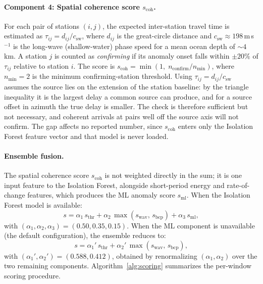 \documentclass{article}
\begin{document}
\paragraph{Component 4: Spatial coherence score $s_\text{coh}$.}
For each pair of stations $(i, j)$, the expected inter-station
travel time is estimated as $\tau_{ij} = d_{ij} / c_\text{sw}$,
where $d_{ij}$ is the great-circle distance and $c_\text{sw} \approx
198$\,m\,s$^{-1}$ is the long-wave (shallow-water) phase speed
for a mean ocean depth of ${\sim}4$\,km. A
station $j$ is counted as \emph{confirming} if its anomaly onset
falls within $\pm 20\%$ of $\tau_{ij}$ relative to station $i$.
The score is $s_\text{coh} = \min(1,\; n_\text{confirm} / n_\text{min})$,
where $n_\text{min} = 2$ is the minimum confirming-station threshold.
Using $\tau_{ij} = d_{ij}/c_\text{sw}$ assumes the source lies on the
extension of the station baseline: by the triangle inequality it is
the largest delay a common source can produce, and for a source
offset in azimuth the true delay is smaller.  The check is therefore
sufficient but not necessary, and coherent arrivals at pairs well off
the source axis will not confirm.  The gap affects no reported number,
since $s_\text{coh}$ enters only the Isolation Forest feature vector
and that model is never loaded.

\paragraph{Ensemble fusion.}
The spatial coherence score $s_\text{coh}$ is not weighted directly in
the sum; it is one input feature to the Isolation Forest, alongside
short-period energy and rate-of-change features, which produces the ML
anomaly score $s_\text{ml}$.
When the Isolation Forest model is available:
\begin{equation}
  s = \alpha_1\, s_\text{thr}
    + \alpha_2\, \max(s_\text{wav},\, s_\text{bcp})
    + \alpha_3\, s_\text{ml},
  \label{eq:ensemble}
\end{equation}
with $(\alpha_1, \alpha_2, \alpha_3) = (0.50, 0.35, 0.15)$.
When the ML component is unavailable (the default configuration),
the ensemble reduces to:
\begin{equation}
  s = \alpha_1'\, s_\text{thr}
    + \alpha_2'\, \max(s_\text{wav},\, s_\text{bcp}),
  \label{eq:ensemble_noml}
\end{equation}
with $(\alpha_1', \alpha_2') = (0.588, 0.412)$, obtained by
renormalizing $(\alpha_1, \alpha_2)$ over the two remaining
components.
Algorithm~\ref{alg:scoring} summarizes the per-window scoring procedure.
\end{document}
